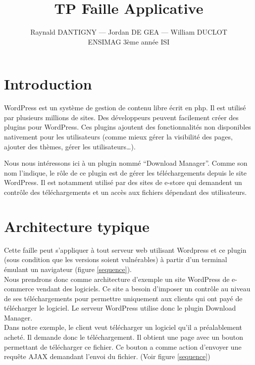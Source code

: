 \documentclass[a4paper,oneside,10pt]{article}
\title{TP Faille Applicative}
\author{Raynald DANTIGNY --- Jordan DE GEA --- William DUCLOT\\
ENSIMAG 3ème année ISI}
\begin{document}
\maketitle


\section{Introduction}
WordPress est un système de gestion de contenu libre écrit en php. Il est utilisé par plusieurs millions de sites. Des développeurs peuvent facilement créer des plugins pour WordPress. Ces plugins ajoutent des fonctionnalités non disponibles nativement pour les utilisateurs (comme mieux gérer la visibilité des pages, ajouter des thèmes, gérer les utilisateurs…). 

Nous nous intéressons ici à un plugin nommé “Download Manager”. Comme son nom l'indique, le rôle de ce plugin est de gérer les téléchargements depuis le site WordPress. Il est notamment utilisé par des sites de e-store qui demandent un contrôle des téléchargements et un accès aux fichiers dépendant des utilisateurs.

\section{Architecture typique}
Cette faille peut s'appliquer à tout serveur web utilisant Wordpress et ce plugin (sous condition que les versions soient vulnérables) à partir d'un terminal émulant un navigateur (figure \ref{sequence}).
\\
Nous prendrons donc comme architecture d'exemple un site WordPress de e-commerce vendant des logiciels. Ce site a besoin d’imposer un contrôle au niveau de ses téléchargements pour permettre uniquement aux clients qui ont payé de télécharger le logiciel. Le serveur WordPress utilise donc le plugin Download Manager.
\\
Dans notre exemple, le client veut télécharger un logiciel qu'il a préalablement acheté. Il demande donc le téléchargement. Il obtient une page avec un bouton permettant de télécharger ce fichier. Ce bouton a comme action d'envoyer une requête AJAX demandant l'envoi du fichier. (Voir figure \ref{sequence})
\end{document}
